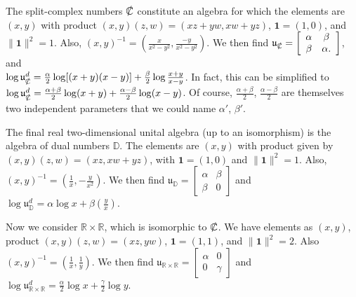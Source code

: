 \documentclass{amsart}
\numberwithin{equation}{section}
\theoremstyle{definition}
\numberwithin{theorem}{section}
\begin{document}
The split-complex numbers $\slashed{\mathbb{C}}$ constitute an algebra for which the elements are  $(x,y)$ with product $(x,y)(z,w) = (xz+yw,xw+yz)$, $ \mathbf{1} = (1,0)$, and $\|\mathbf{1}\|^2 = 1$.  Also, $(x,y)^{-1} = (\frac{x}{x^2-y^2},\frac{-y}{x^2-y^2})$. \hspace{1cm}  We then find $\mathfrak{u}_{\slashed{\mathbb{C}}} = \left[\begin{array}{ccc}
 \alpha & \beta   \\ 
 \beta & \alpha.    
\end{array}\right]$, \hspace{.5cm} and \hfill \\ $\log  \mathfrak{u}^d_{\slashed{\mathbb{C}}} = \frac{\alpha}{2}\log[(x+
y)(x-y)] +  \frac{\beta}{2}\log \frac{x+y}{x-y}$.  In fact, this can be simplified to $\log  \mathfrak{u}^d_{\slashed{\mathbb{C}}} = \frac{\alpha+\beta}{2}\log(x+y) + \frac{\alpha-\beta}{2}\log(x-y)$.  Of course, $\frac{\alpha+\beta}{2}$, $\frac{\alpha-\beta}{2}$ are themselves two independent parameters that we could name $\alpha'$, $\beta'$.

The final real two-dimensional unital algebra (up to an isomorphism) is the algebra of dual numbers $\mathbb{D}$.  The elements are $(x,y)$ with product given by $(x,y)(z,w) = (xz,xw+yz)$, with $\mathbf{1}=(1,0)$ and $\|\mathbf{1}\|^2 = 1$. Also, $(x,y)^{-1} = (\frac{1}{x},-\frac{y}{x^2})$.  We then find $\mathfrak{u}_\mathbb{D} = \left[\begin{array}{ccc}
 \alpha & \beta   \\ 
 \beta & 0    
\end{array}\right]$ and $\log  \mathfrak{u}^d_{\mathbb{D}} = \alpha\log x + \beta\left(\frac{y}{x}\right)$. 

   
   Now we consider $\mathbb{R}\times\mathbb{R}$, which is isomorphic to $\slashed{\mathbb{C}}$.  We have elements as $(x,y)$, product $(x,y)(z,w) = (xz,yw)$, $\mathbf{1}=(1,1)$, and $\|\mathbf{1}\|^2 = 2$.  Also $(x,y)^{-1} = (\frac{1}{x},\frac{1}{y})$.  We then find $\mathfrak{u}_{\mathbb{R}\times\mathbb{R}} = \left[\begin{array}{ccc}
 \alpha & 0   \\ 
 0 & \gamma    
\end{array}\right]$ and $\log  \mathfrak{u}^d_{\mathbb{R}\times\mathbb{R}} = \frac{\alpha}{2}\log x + \frac{\gamma}{2}\log y$. 
\end{document}
